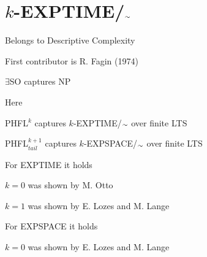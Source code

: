 
\section{$k$-EXPTIME/$_{\raise.17ex\hbox{$\scriptstyle\sim$}}$}

\begin{frame}

\begin{compactenum}[$\bullet$]
\item<1-> Belongs to Descriptive Complexity
\item<2-> First contributor is R. Fagin (1974)
\item<3-> $\exists$SO captures NP
\end{compactenum}

\vspace{0.3cm}
 Here
\begin{compactenum}[$\bullet$]
\item<4-> PHFL$^k$ captures $k$-EXPTIME/$_{\raise.17ex\hbox{$\scriptstyle\sim$}}$ over finite LTS
\item<4-> PHFL$^{k+1}_{tail}$ captures $k$-EXPSPACE/$_{\raise.17ex\hbox{$\scriptstyle\sim$}}$ over finite LTS
\end{compactenum}

\vspace{0.3cm}
For EXPTIME it holds
\begin{compactenum}[$\bullet$]
\item<5-> $k=0$ was shown by M. Otto
\item<5-> $k=1$ was shown by E. Lozes and M. Lange
\end{compactenum}

\vspace{0.3cm}
For EXPSPACE it holds
\begin{compactenum}[$\bullet$]
\item<6-> $k=0$ was shown by E. Lozes and M. Lange
\end{compactenum}

\end{frame}
